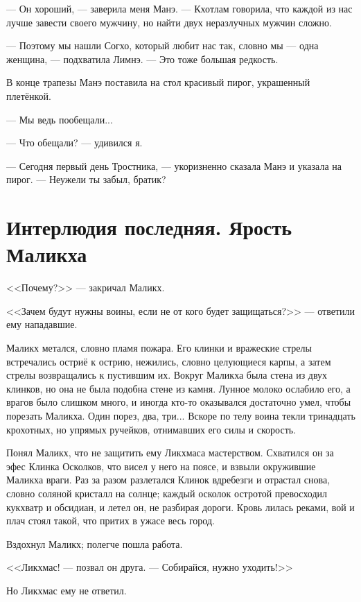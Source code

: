 --- Он хороший, --- заверила меня Манэ.
--- Кхотлам говорила, что каждой из нас лучше завести своего мужчину, но найти двух неразлучных мужчин сложно.

--- Поэтому мы нашли Согхо, который любит нас так, словно мы --- одна женщина, --- подхватила Лимнэ.
--- Это тоже большая редкость.

В конце трапезы Манэ поставила на стол красивый пирог, украшенный плетёнкой.

--- Мы ведь пообещали...

--- Что обещали? --- удивился я.

--- Сегодня первый день Тростника, --- укоризненно сказала Манэ и указала на пирог.
--- Неужели ты забыл, братик?

\chapter*{Интерлюдия последняя. Ярость Маликха}

<<Почему?>> --- закричал Маликх.

<<Зачем будут нужны воины, если не от кого будет защищаться?>> --- ответили ему нападавшие.

\textspace

Маликх метался, словно пламя пожара.
Его клинки и вражеские стрелы встречались остриё к острию, нежились, словно целующиеся карпы, а затем стрелы возвращались к пустившим их.
Вокруг Маликха была стена из двух клинков, но она не была подобна стене из камня.
Лунное молоко ослабило его, а врагов было слишком много, и иногда кто-то оказывался достаточно умел, чтобы порезать Маликха.
Один порез, два, три...
Вскоре по телу воина текли тринадцать крохотных, но упрямых ручейков, отнимавших его силы и скорость.

Понял Маликх, что не защитить ему Ликхмаса мастерством.
Схватился он за эфес Клинка Осколков, что висел у него на поясе, и взвыли окружившие Маликха враги.
Раз за разом разлетался Клинок вдребезги и отрастал снова, словно соляной кристалл на солнце;
каждый осколок остротой превосходил кукхватр и обсидиан, и летел он, не разбирая дороги.
Кровь лилась реками, вой и плач стоял такой, что притих в ужасе весь город.

Вздохнул Маликх;
полегче пошла работа.

<<Ликхмас! --- позвал он друга.
--- Собирайся, нужно уходить!>>

Но Ликхмас ему не ответил.

